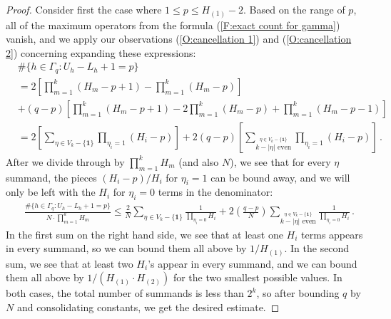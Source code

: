 \documentclass[11pt, oneside]{amsart}   	%
\newcommand{\1}{\mathbbm{1}}
\theoremstyle{definition}
\begin{document}
\begin{proof}
Consider first the case where $1 \leq p \leq H_{(1)} - 2$. Based on the range of $p$, all of the maximum operators from the formula (\ref{F:exact count for gamma}) vanish, and we apply our observations (\ref{O:cancellation 1}) and (\ref{O:cancellation 2}) concerning expanding these expressions:
\begin{align*}
&\#\{h\in \Gamma_q : U_h - L_h +1 = p\} \\ &= 2 \left[ \prod_{m=1}^k (H_m - p + 1) - \prod_{m=1}^k (H_m - p)\right] \\
&+ (q - p) \left[ \prod_{m=1}^k (H_m - p+1) - 2\prod_{m=1}^k (H_m - p)  + \prod_{m=1}^k (H_m - p - 1)\right] \\
&= 2 \left[ \sum_{\eta \in V_{k} - \{ \mathbf{1}\}} \prod_{\eta_{i} = 1} (H_i - p)\right] + 2(q - p) \left[\sum_{\overset{\eta \in V_k - \{\mathbf{1}\}}{k - |\eta| \text{ even}}} \prod_{\eta_{i} = 1} (H_i - p) \right]\, .
\end{align*}
After we divide through by $\prod_{m=1}^k H_m$ (and also $N$), we see that for every $\eta$ summand, the pieces $(H_i - p)/H_i$ for $\eta_i = 1$ can be bound away, and we will only be left with the $H_i$ for $\eta_i = 0$ terms in the denominator:
\begin{align*}
&\frac{\#\{h\in \Gamma_q : U_h - L_h +1 = p\}}{N \cdot \prod_{m=1}^k H_m} \leq \frac{2}{N} \sum_{\eta \in V_{k} - \{ \mathbf{1}\}} \frac{1}{\prod_{\eta_{i} = 0} H_i}  + 2\left(\frac{q - p}{N}\right) \sum_{\overset{\eta \in V_k - \{\mathbf{1}\}}{k - |\eta| \text{ even}}} \frac{1}{\prod_{\eta_{i} = 0} H_i }\, .
\end{align*}
In the first sum on the right hand side, we see that at least one $H_i$ terms appears in every summand, so we can bound them all above by $1/H_{(1)}$. In the second sum, we see that at least two $H_i$'s appear in every summand, and we can bound them all above by $1/({H_{(1)}} \cdot H_{(2)})$ for the two smallest possible values. In both cases, the total number of summands is less than $2^k$, so after bounding $q$ by $N$ and consolidating constants, we get the desired estimate.


\end{proof}
\end{document}

